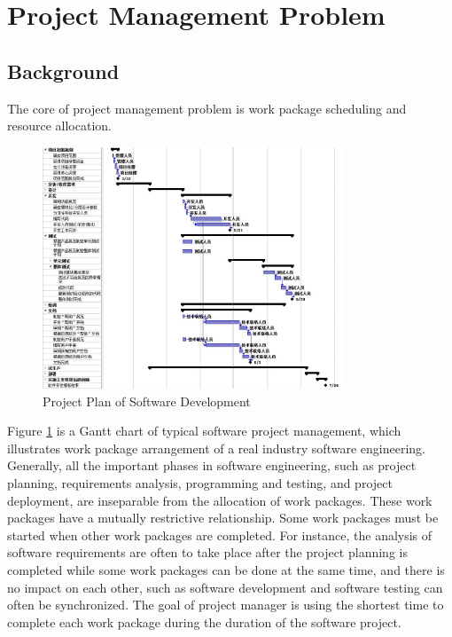 
\section{Project Management Problem}
%

\subsection{Background}
%

The core of project management problem is work package scheduling and resource
allocation.

\begin{figure}[!ht]
  \centering
  \includegraphics[width=0.8\textwidth]{figures/pm_sample.jpg}
  \caption{Project Plan of Software Development}
  \label{fig:sample}
\end{figure}


Figure \ref{fig:sample} is a Gantt chart of typical software project management, which
illustrates work package arrangement of a real industry software engineering.
Generally, all the important phases in software engineering, such as project
planning, requirements analysis, programming and testing, and project
deployment, are inseparable from the allocation of work packages.  These work
packages have a mutually restrictive relationship. Some work packages must be
started when other work packages are completed. For instance, the analysis of
software requirements are often to take place after the project planning is
completed while some work packages can be done at the same time, and there is no
impact on each other, such as software development and software testing can
often be synchronized.  The goal of project manager is using the shortest time
to complete each work package during the duration of the software project.


